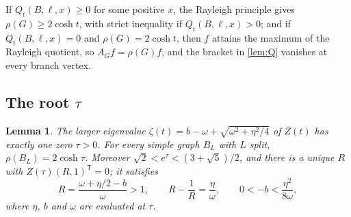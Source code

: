 \documentclass[11pt]{article}
\newtheorem{lemma}[theorem]{Lemma}
\theoremstyle{definition}
\theoremstyle{remark}
\begin{document}
If $Q_t(B,\ell,x)\ge0$ for some positive $x$, the Rayleigh principle gives $\rho(G)\ge2\cosh t$, with strict inequality
if $Q_t(B,\ell,x)>0$; and if $Q_t(B,\ell,x)=0$ and $\rho(G)=2\cosh t$, then $f$ attains the maximum of the Rayleigh
quotient, so $A_Gf=\rho(G)f$, and the bracket in \cref{lem:Q} vanishes at every branch vertex.

\subsection{The root \texorpdfstring{$\tau$}{tau}}

\begin{lemma}\label{lem:tau}
The larger eigenvalue $\zeta(t)=b-\omega+\sqrt{\omega^2+\eta^2/4}$ of $Z(t)$ has exactly one zero $\tau>0$. For every
simple graph $B_L$ with $L$ split, $\rho(B_L)=2\cosh\tau$. Moreover $\sqrt2<e^\tau<(3+\sqrt5)/2$, and there is a
unique $R$ with $Z(\tau)(R,1)^{\mathsf T}=0$; it satisfies
\begin{equation}\label{eq:R}
R=\frac{\omega+\eta/2-b}{\omega}>1,\qquad R-\frac1R=\frac{\eta}{\omega},\qquad 0<-b<\frac{\eta^2}{8\omega},
\end{equation}
where $\eta$, $b$ and $\omega$ are evaluated at $\tau$.
\end{lemma}
\end{document}
